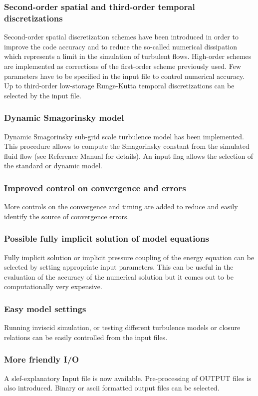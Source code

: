 \subsubsection*{Second-order spatial and third-order temporal discretizations}
Second-order spatial discretization schemes have been introduced in order
to improve the code accuracy and to reduce the so-called numerical 
dissipation which represents a limit in the simulation of turbulent flows.
High-order schemes are implemented as corrections of the first-order
scheme previously used. Few parameters have to be specified in the input
file to control numerical accuracy. Up to third-order low-storage 
Runge-Kutta temporal discretizations can be selected by the input file.

\subsubsection*{Dynamic Smagorinsky model}
Dynamic Smagorinsky sub-grid scale turbulence model has been implemented. 
This procedure allows to compute the Smagorinsky constant from the simulated
fluid flow (see Reference Manual for details).
An input flag allows the selection of the standard or dynamic model.

\subsubsection*{Improved control on convergence and errors}
More controls on the convergence and timing are added to reduce and
easily identify the source of convergence errors.

\subsubsection*{Possible fully implicit solution of model equations}
Fully implicit solution or implicit pressure coupling of the energy
equation can be selected by setting appropriate input parameters. This can
be useful in the evaluation of the accuracy of the numerical solution
but it comes out to be computationally very expensive.

\subsubsection*{Easy model settings}
Running inviscid simulation, or testing different turbulence models or closure 
relations can be easily controlled from the input files.

\subsubsection*{More friendly I/O}
A slef-explanatory Input file is now available. Pre-processing of OUTPUT files
is also introduced. Binary or ascii formatted output files can be selected.

